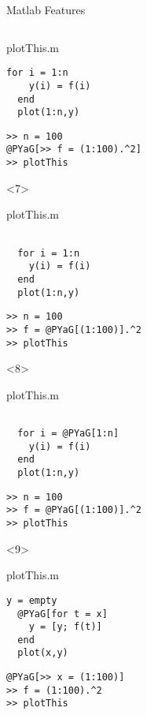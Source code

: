 \begin{frame}[fragile]{Matlab Features}
\begin{columns}
\begin{column}[T]{5cm}
\begin{onlyenv}
\begin{block}{plotThis.m}
\begin{Verbatim}[commandchars=@\[\]]
  for i = 1:n
    y(i) = f(i)
  end
  plot(1:n,y)
          \end{Verbatim}
        \end{block}
          \begin{Verbatim}[commandchars=@\[\]]
>> n = 100
@PYaG[>> f = (1:100).^2]
>> plotThis
        \end{Verbatim}
      \end{onlyenv}
      \begin{onlyenv}<7>
        \begin{block}{plotThis.m}
          \begin{Verbatim}[commandchars=@\[\]]

  for i = 1:n
    y(i) = f(i)
  end
  plot(1:n,y)
          \end{Verbatim}
        \end{block}
          \begin{Verbatim}[commandchars=@\[\]]
>> n = 100
>> f = @PYaG[(1:100)].^2
>> plotThis
        \end{Verbatim}
      \end{onlyenv}
      \begin{onlyenv}<8>
        \begin{block}{plotThis.m}
          \begin{Verbatim}[commandchars=@\[\]]

  for i = @PYaG[1:n]
    y(i) = f(i)
  end
  plot(1:n,y)
          \end{Verbatim}
        \end{block}
          \begin{Verbatim}[commandchars=@\[\]]
>> n = 100
>> f = @PYaG[(1:100)].^2
>> plotThis
        \end{Verbatim}
      \end{onlyenv}
      \begin{onlyenv}<9>
        \begin{block}{plotThis.m}
          \begin{Verbatim}[commandchars=@\[\]]
  y = empty
  @PYaG[for t = x]
    y = [y; f(t)]
  end
  plot(x,y)
          \end{Verbatim}
        \end{block}
          \begin{Verbatim}[commandchars=@\[\]]
@PYaG[>> x = (1:100)]
>> f = (1:100).^2
>> plotThis
        \end{Verbatim}
      \end{onlyenv}


\end{column}
\end{columns}
\end{frame}
